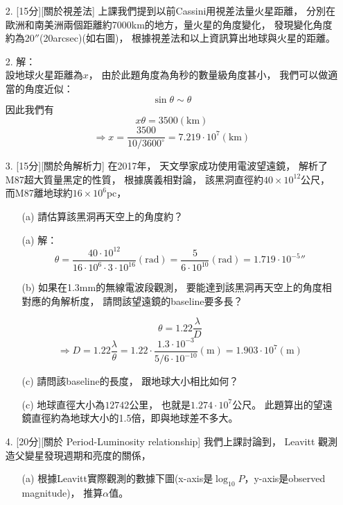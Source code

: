 \documentclass{article}
\theoremstyle{definition}
\begin{document}
\begin{enumerate}
	\item[2.] [15分][關於視差法] 上課我們提到以前Cassini用視差法量火星距離，
		分別在歐洲和南美洲兩個距離約7000km的地方，量火星的角度變化，
		發現變化角度約為$20''$(20arcsec)(如右圖)，
		根據視差法和以上資訊算出地球與火星的距離。

	\item[2.] 解：\\
		設地球火星距離為$x$，
		由於此題角度為角秒的數量級角度甚小，
		我們可以做適當的角度近似：
		\[
			\sin \theta \sim \theta
		\]
		因此我們有
		\[
			x \theta = 3500 (\text{km})
		\]
		\[
			\Rightarrow x = \frac{3500}{10/3600^{\circ}} = 7.219 \cdot 10^7 (\text{km})
		\]

	\item[3.] [15分][關於角解析力] 在2017年，
		天文學家成功使用電波望遠鏡，
		解析了M87超大質量黑定的性質，
		根據廣義相對論，
		該黑洞直徑約$40 \times 10^{12}$公尺，
		而M87離地球約$16 \times 10^6$pc，
		\begin{enumerate}
			\item[(a)] 請估算該黑洞再天空上的角度約？

			\item[(a)] 解：\\
				\[
					\theta = \frac{40 \cdot 10^{12}}{16 \cdot 10^6 \cdot 3 \cdot 10^{16}} (\text{rad}) = \frac{5}{6 \cdot 10^{10}} (\text{rad}) = 1.719 \cdot 10^{-5} ''
				\]

			\item[(b)] 如果在1.3mm的無線電波段觀測，
				要能達到該黑洞再天空上的角度相對應的角解析度，
				請問該望遠鏡的baseline要多長？

				\[
					\theta = 1.22 \frac{\lambda}{D}
				\]
				\[
					\Rightarrow D = 1.22 \frac{\lambda}{\theta} = 1.22 \cdot \frac{1.3 \cdot 10^{-3}}{5/6 \cdot 10^{-10}}(\text{m}) = 1.903 \cdot 10^7 (\text{m})
				\]


			\item[(c)] 請問該baseline的長度，
				跟地球大小相比如何？

			\item[(c)] 地球直徑大小為$12742$公里，
				也就是$1.274 \cdot 10^7$公尺。
				此題算出的望遠鏡直徑約為地球大小的1.5倍，即與地球差不多大。
		\end{enumerate}

	\item[4.] [20分][關於 Period-Luminosity relationship] 我們上課討論到，
		Leavitt 觀測造父變星發現週期和亮度的關係，
		\begin{enumerate}
			\item[(a)] 根據Leavitt實際觀測的數據下圖(x-axis是$\log_{10} P$，y-axis是observed magnitude)，
				推算$\alpha$值。


\end{enumerate}
\end{enumerate}
\end{document}
